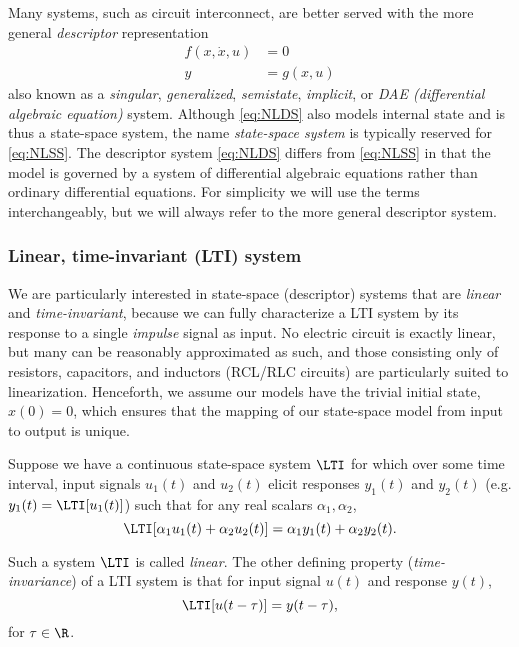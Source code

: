 Many systems, such as circuit interconnect, are better served with the more general \emph{descriptor} representation
\begin{equation}
\begin{aligned}
 f(x,\dot{x},u) &= 0 \\
y &= g(x,u)
\label{eq:NLDS}
\end{aligned}
\end{equation}
also known as a \emph{singular},  \emph{generalized}, \emph{semistate},  \emph{implicit}, or \emph{DAE (differential algebraic equation)} system.   Although \eqref{eq:NLDS} also models internal state and is thus a state-space system, the name \emph{state-space system} is typically reserved for \eqref{eq:NLSS}.    The descriptor system \eqref{eq:NLDS} differs from \eqref{eq:NLSS} in that the model is governed by a system of differential algebraic equations rather than ordinary differential equations.  For simplicity we will use the terms interchangeably, but we will always refer to the more general descriptor system.


\subsubsection{Linear, time-invariant (LTI) system}
We are particularly interested in state-space (descriptor) systems that are \emph{linear} and \emph{time-invariant}, because we can fully characterize a LTI system by its response to a single \emph{impulse} signal as input.      
No electric circuit is exactly linear, but many can be reasonably approximated as such, and those consisting only of resistors, capacitors, and inductors (RCL/RLC circuits) are particularly suited to linearization. 
Henceforth, we assume our models have the trivial initial state, $x(0)= 0$, which ensures that the mapping of our state-space model from input to output is unique.    

Suppose we have a continuous state-space system
$\LTI$ for which over some time interval, input signals $u_1(t)$ and $u_2(t)$ elicit responses $y_1(t)$ and $y_2(t)$ (e.g. $y_1(t)=\LTI[u_1(t)]$) such  that for any real scalars $\alpha_1 , \alpha_2$, 
\[
\LTI[\alpha_1 u_1(t) +\alpha_2 u_2(t)]   =  \alpha_1 y_1(t) +\alpha_2 y_2(t).
\]

Such a system $\LTI$ is called \emph{linear}.    The other defining property (\emph{time-invariance}) of a LTI system is that for input signal $u(t)$ and response $y(t)$,   
\[
\LTI[u(t-\tau)] = y(t-\tau),
\]
for $\tau\in\R$.

